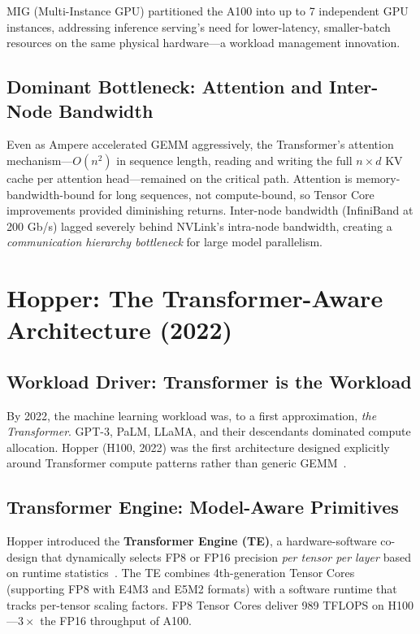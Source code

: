 \documentclass[10pt,twocolumn]{article}
\begin{document}
MIG (Multi-Instance GPU) partitioned the A100 into up to 7 independent GPU instances, addressing inference serving's need for lower-latency, smaller-batch resources on the same physical hardware—a workload management innovation.

\subsection{Dominant Bottleneck: Attention and Inter-Node Bandwidth}

Even as Ampere accelerated GEMM aggressively, the Transformer's attention mechanism—$O(n^2)$ in sequence length, reading and writing the full $n\times d$ KV cache per attention head—remained on the critical path. Attention is memory-bandwidth-bound for long sequences, not compute-bound, so Tensor Core improvements provided diminishing returns. Inter-node bandwidth (InfiniBand at 200 Gb/s) lagged severely behind NVLink's intra-node bandwidth, creating a \textit{communication hierarchy bottleneck} for large model parallelism.

\section{Hopper: The Transformer-Aware Architecture (2022)}
\label{sec:hopper}

\subsection{Workload Driver: Transformer is the Workload}

By 2022, the machine learning workload was, to a first approximation, \textit{the Transformer}. GPT-3, PaLM, LLaMA, and their descendants dominated compute allocation. Hopper (H100, 2022) was the first architecture designed explicitly around Transformer compute patterns rather than generic GEMM~\citep{nvidia2022hopper}.

\subsection{Transformer Engine: Model-Aware Primitives}

Hopper introduced the \textbf{Transformer Engine (TE)}, a hardware-software co-design that dynamically selects FP8 or FP16 precision \textit{per tensor per layer} based on runtime statistics~\citep{choquette2021nvidia}. The TE combines 4th-generation Tensor Cores (supporting FP8 with E4M3 and E5M2 formats) with a software runtime that tracks per-tensor scaling factors. FP8 Tensor Cores deliver 989 TFLOPS on H100—$3\times$ the FP16 throughput of A100.
\end{document}
